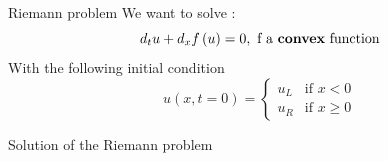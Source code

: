 \documentclass{beamer}
\begin{document}
            \begin{frame}{Riemann problem}
                We want to solve : 
                    \begin{equation*}
                        d_t u + d_x f\left(u\right) = 0,\text{ f a {\bf convex} function}
                    \end{equation*}
                \pause
                With the following initial condition
                \begin{equation*}
                u\left(x,t=0\right) = 
                 \begin{cases}
                    u_L & \text{if $x < 0$}\\
                    u_R & \text{if $x \geq 0$}
                \end{cases}  
                \end{equation*}
            \end{frame}
            \begin{frame}{Solution of the Riemann problem}
                \begin{enumerate}
                \end{enumerate}
            \end{frame}
            
            
            
    
\end{document}
